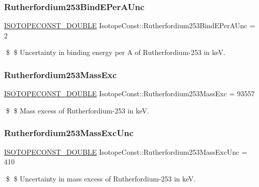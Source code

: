 \subsubsection{\texorpdfstring{Rutherfordium253\+Bind\+E\+Per\+A\+Unc}{Rutherfordium253BindEPerAUnc}}
{\footnotesize\ttfamily \mbox{\hyperlink{group___isotope_const-_macros_ga8f45a7272ce02c0b4c65c44636ed719a}{I\+S\+O\+T\+O\+P\+E\+C\+O\+N\+S\+T\+\_\+\+D\+O\+U\+B\+LE}} Isotope\+Const\+::\+Rutherfordium253\+Bind\+E\+Per\+A\+Unc = 2}

\$ \$ Uncertainty in binding energy per A of Rutherfordium-\/253 in keV. \mbox{\label{group___isotope_const-_rutherfordium-_rf253_ga00d3d033aac717e0e00fa9b303866465}} 
\subsubsection{\texorpdfstring{Rutherfordium253\+Mass\+Exc}{Rutherfordium253MassExc}}
{\footnotesize\ttfamily \mbox{\hyperlink{group___isotope_const-_macros_ga8f45a7272ce02c0b4c65c44636ed719a}{I\+S\+O\+T\+O\+P\+E\+C\+O\+N\+S\+T\+\_\+\+D\+O\+U\+B\+LE}} Isotope\+Const\+::\+Rutherfordium253\+Mass\+Exc = 93557}

\$ \$ Mass excess of Rutherfordium-\/253 in keV. \mbox{\label{group___isotope_const-_rutherfordium-_rf253_ga956b23ff545d6ef256f27651942c6960}} 
\subsubsection{\texorpdfstring{Rutherfordium253\+Mass\+Exc\+Unc}{Rutherfordium253MassExcUnc}}
{\footnotesize\ttfamily \mbox{\hyperlink{group___isotope_const-_macros_ga8f45a7272ce02c0b4c65c44636ed719a}{I\+S\+O\+T\+O\+P\+E\+C\+O\+N\+S\+T\+\_\+\+D\+O\+U\+B\+LE}} Isotope\+Const\+::\+Rutherfordium253\+Mass\+Exc\+Unc = 410}

\$ \$ Uncertainty in mass excess of Rutherfordium-\/253 in keV. \mbox{\label{group___isotope_const-_rutherfordium-_rf253_ga027e89d7fe21fb44fd285bcb48f2f746}} 
